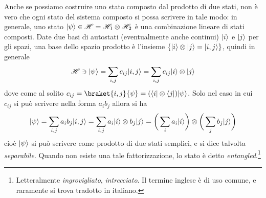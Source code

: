 Anche se possiamo costruire uno stato composto dal prodotto di due stati, non è vero che ogni stato del sistema composto si possa scrivere in tale modo: in generale, uno stato $\lvert\psi\rangle\in\mathscr H=\mathscr H_1\otimes\mathscr H_2$ è una combinazione lineare di stati composti.
Date due basi di autostati (eventualmente anche continui) $\lvert i\rangle$ e $\lvert j\rangle$ per gli spazi, una base dello spazio prodotto è l'insieme $\{\lvert i\rangle\otimes\lvert j\rangle=\lvert i,j\rangle\}$, quindi in generale
\begin{equation}
	\mathscr H\ni\lvert\psi\rangle=\sum_{i,j}c_{ij}\lvert i,j\rangle=\sum_{i,j}c_{ij}\lvert i\rangle\otimes\lvert j\rangle
\end{equation}
dove come al solito $c_{ij}=\braket{i,j}{\psi}=(\bra{i}\otimes\bra{j})\ket{\psi}$.
Solo nel caso in cui $c_{ij}$ si può scrivere nella forma $a_ib_j$ allora si ha
\begin{equation}
	\lvert\psi\rangle=\sum_{i,j}a_ib_j\lvert i,j\rangle=\sum_{i,j}a_i\lvert i\rangle\otimes b_j\lvert j\rangle=\bigg(\sum_ia_i\lvert i\rangle\bigg)\otimes\bigg(\sum_jb_j\lvert j\rangle\bigg)
\end{equation}
cioè $\lvert\psi\rangle$ si può scrivere come prodotto di due stati semplici, e si dice talvolta \emph{separabile}.
Quando non esiste una tale fattorizzazione, lo stato è detto \emph{entangled}.\footnote{
	Letteralmente \textit{ingrovigliato}, \textit{intrecciato}.
	Il termine inglese è di uso comune, e raramente si trova tradotto in italiano.
}

